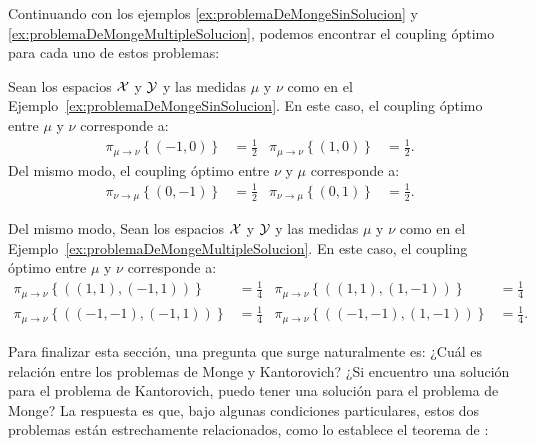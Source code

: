 {{{			%

			Continuando con los ejemplos \ref*{ex:problemaDeMongeSinSolucion} y \ref*{ex:problemaDeMongeMultipleSolucion}, podemos encontrar el coupling óptimo para cada uno de estos problemas:

			\begin{example}
				Sean los espacios $\mathcal{X}$ y $\mathcal{Y}$ y las medidas $\mu$ y $\nu$ como en el Ejemplo~\ref*{ex:problemaDeMongeSinSolucion}. En este caso, el coupling óptimo entre $\mu$ y $\nu$ corresponde a:
				\begin{align*}
					\pi_{\mu \to \nu}\left\{ (-1, 0) \right\} & = \frac{1}{2} & \pi_{\mu \to \nu}\left\{ (1, 0) \right\} & = \frac{1}{2}.
				\end{align*}
				Del mismo modo, el coupling óptimo entre $\nu$ y $\mu$ corresponde a:
				\begin{align*}
					\pi_{\nu \to \mu}\left\{ (0, -1) \right\} & = \frac{1}{2} & \pi_{\nu \to \mu}\left\{ (0, 1) \right\} & = \frac{1}{2}.
				\end{align*}

			\end{example}

			\begin{example}
				Del mismo modo, Sean los espacios $\mathcal{X}$ y $\mathcal{Y}$ y las medidas $\mu$ y $\nu$ como en el Ejemplo~\ref*{ex:problemaDeMongeMultipleSolucion}. En este caso, el coupling óptimo entre $\mu$ y $\nu$ corresponde a:
				\begin{align*}
					\pi_{\mu \to \nu}\left\{ ((1, 1), (-1, 1)) \right\}   & = \frac{1}{4} & \pi_{\mu \to \nu}\left\{ ((1, 1), (1, -1)) \right\}   & = \frac{1}{4}  \\
					\pi_{\mu \to \nu}\left\{ ((-1, -1), (-1, 1)) \right\} & = \frac{1}{4} & \pi_{\mu \to \nu}\left\{ ((-1, -1), (1, -1)) \right\} & = \frac{1}{4}.
				\end{align*}

			\end{example}

			Para finalizar esta sección, una pregunta que surge naturalmente es: ¿Cuál es relación entre los problemas de Monge y Kantorovich? ¿Si encuentro una solución para el problema de Kantorovich, puedo tener una solución para el problema de Monge? La respuesta es que, bajo algunas condiciones particulares, estos dos problemas están estrechamente relacionados, como lo establece el teorema de \cite{brenier1991polar}:

}}}
